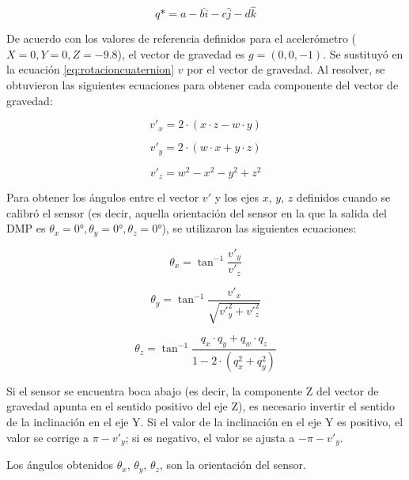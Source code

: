 \begin{equation}
	q* = a - b\hat{i} - c\hat{j} - d\hat{k}
	\label{eq:eqcuaternionconj}
\end{equation}

De acuerdo con los valores de referencia definidos para el acelerómetro ($X=0, Y=0, Z=-9.8$), el vector de gravedad es $g = (0, 0, -1)$. Se sustituyó en la ecuación \ref{eq:rotacioncuaternion} $v$ por el vector de gravedad. Al resolver, se obtuvieron las siguientes ecuaciones para obtener cada componente del vector de gravedad:

\begin{equation}
	v'_x = 2\cdot(x \cdot z - w \cdot y)
	\label{eq:componentex}
\end{equation}

\begin{equation}
	v'_y = 2\cdot(w \cdot x + y \cdot z)
	\label{eq:componentey}
\end{equation}

\begin{equation}
	v'_z = w^2 - x^2 - y^2 + z^2
	\label{eq:componentez}
\end{equation}

Para obtener los ángulos entre el vector $v'$ y los ejes $x$, $y$, $z$ definidos cuando se calibró el sensor (es decir, aquella orientación del sensor en la que la salida del DMP es $\theta_x = 0°,\theta_y = 0°,\theta_z = 0°$), se utilizaron las siguientes ecuaciones:

\begin{equation}
	\theta_x = \tan^{-1}\frac{v'_y}{v'_z}
	\label{eq:angulox}
\end{equation}

\begin{equation}
	\theta_y = \tan^{-1}\frac{v'_x}{\sqrt{v'^2_y + v'^2_z}}
	\label{eq:anguloy}
\end{equation}

\begin{equation}
	\theta_z = \tan^{-1}\frac{q_x \cdot q_y + q_w \cdot q_z}{1 - 2 \cdot (q_x^2 + q_y^2)}
	\label{eq:anguloz}
\end{equation}

Si el sensor se encuentra boca abajo (es decir, la componente Z del vector de gravedad apunta en el sentido positivo del eje Z), es necesario invertir el sentido de la inclinación en el eje Y. Si el valor de la inclinación en el eje Y es positivo, el valor se corrige a $\pi - v'_y$; si es negativo, el valor se ajusta a $-\pi - v'_y$.

Los ángulos obtenidos $\theta_x$, $\theta_y$, $\theta_z$, son la orientación del sensor.